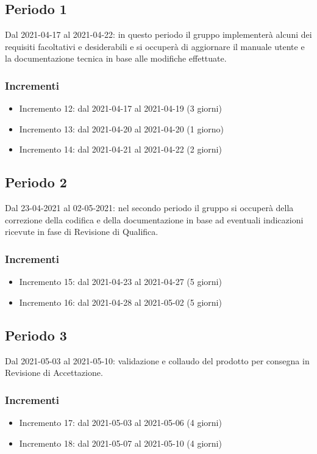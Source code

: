 \subsection{Periodo 1}
Dal 2021-04-17 al 2021-04-22: in questo periodo il gruppo implementerà alcuni dei requisiti facoltativi e desiderabili e si occuperà di aggiornare il manuale utente e la documentazione tecnica in base alle modifiche effettuate. 
\subsubsection{Incrementi}
\begin{itemize}
	\item Incremento 12: dal 2021-04-17 al 2021-04-19 (3 giorni)
	\item Incremento 13: dal 2021-04-20 al 2021-04-20 (1 giorno)
	\item Incremento 14: dal 2021-04-21 al 2021-04-22 (2 giorni)
\end{itemize}
\subsection{Periodo 2}
Dal 23-04-2021 al 02-05-2021: nel secondo periodo il gruppo si occuperà della correzione della codifica e della documentazione in base ad eventuali indicazioni ricevute in fase di Revisione di Qualifica.
\subsubsection{Incrementi}
\begin{itemize}
	\item Incremento 15: dal 2021-04-23 al 2021-04-27 (5 giorni)
	\item Incremento 16: dal 2021-04-28 al 2021-05-02 (5 giorni)
\end{itemize}
\subsection{Periodo 3}
Dal 2021-05-03 al 2021-05-10: validazione e collaudo del prodotto per consegna in Revisione di Accettazione.
\subsubsection{Incrementi}
\begin{itemize}
	\item Incremento 17: dal 2021-05-03 al 2021-05-06 (4 giorni)
	\item Incremento 18: dal 2021-05-07 al 2021-05-10 (4 giorni)
\end{itemize}
